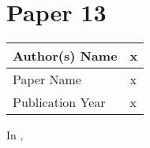 \section{Paper 13}
    \begin{center}
    \begin{tabular}{ | m{5em} | m{25em} |} 
      \hline
      Author(s) Name &  x\\ 
      \hline
      Paper Name &  x\\ 
      \hline
      Publication Year &  x\\ 
      \hline
    \end{tabular}
    \end{center}
    In \cite{}, 